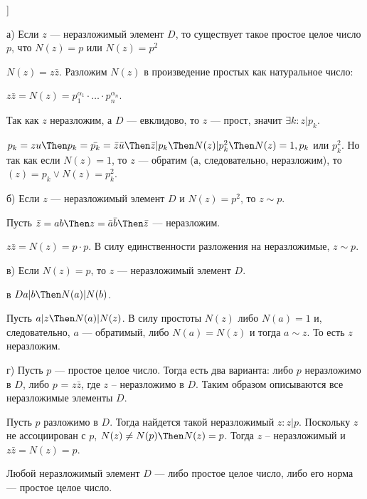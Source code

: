 \begin{problem} [?? (?.?)]
\end{problem}
\begin{solution}
\end{solution}

\begin{problem}[?? [Каргальцев]]
\end{problem}

\begin{solution}
	а) Если \(z\) --- неразложимый элемент \(D\), то существует такое простое целое число \(p\), что \(N(z) = p\) или \(N(z) = p^2\)
	
	\(N(z) = z\bar{z}\). Разложим \(N(z)\) в произведение простых как натуральное число:
	
	\(z\bar{z} = N(z) = p_1^{\alpha_1} \cdot \ldots \cdot p_n^{\alpha_n}\).
	
	Так как \(z\) неразложим, а \(D\) --- евклидово, то \(z\) --- прост, значит \(\exists k: z | p_k\).
	
	\(p_k = zu \Then p_k = \bar{p_k} = \bar{z}\bar{u} \Then \bar{z} | p_k \Then N(z) | p_k^2 \Then N(z) = 1, p_k\) или \(p_k^2\). Но так как если \(N(z) = 1\), то \(z\) --- обратим (а, следовательно, неразложим), то \((z) = p_k \lor N(z) = p_k^2\).
	
	б) Если \(z\) --- неразложимый элемент \(D\) и \(N(z) = p^2\), то \(z \sim p\).
	
	Пусть \(\bar{z} = ab \Then z = \bar{a} \bar{b} \Then \bar{z}\) --- неразложим.
	
	\(z \bar{z} = N(z) = p \cdot p\). В силу единственности разложения на неразложимые, \(z \sim p\).
	
	в) Если \(N(z) = p\), то \(z\) --- неразложимый элемент \(D\).
	
	в \(D a|b \Then N(a) | N(b)\).
	
	Пусть \(a | z \Then N(a) | N(z)\). В силу простоты \(N(z)\) либо \(N(a) = 1\) и, следовательно, \(a\) --- обратимый, либо \(N(a) = N(z)\) и тогда \(a \sim z\). То есть \(z\) неразложим.
	
	г) Пусть \(p\) --- простое целое число. Тогда есть два варианта: либо \(p\) неразложимо в \(D\), либо \(p\) = \(z\bar{z}\), где \(z\) -- неразложимо в \(D\). Таким образом описываются все неразложимые элементы \(D\).
	
	Пусть \(p\) разложимо в \(D\). Тогда найдется такой неразложимый \(z: z|p\). Поскольку \(z\) не ассоциирован с \(p\), \(N(z) \ne N(p) \Then N(z) = p\). Тогда \(z\) -- неразложимый и \(z\bar{z} = N(z) = p\).
	
	Любой неразложимый элемент \(D\) --- либо простое целое число, либо его норма --- простое целое число.
\end{solution}


